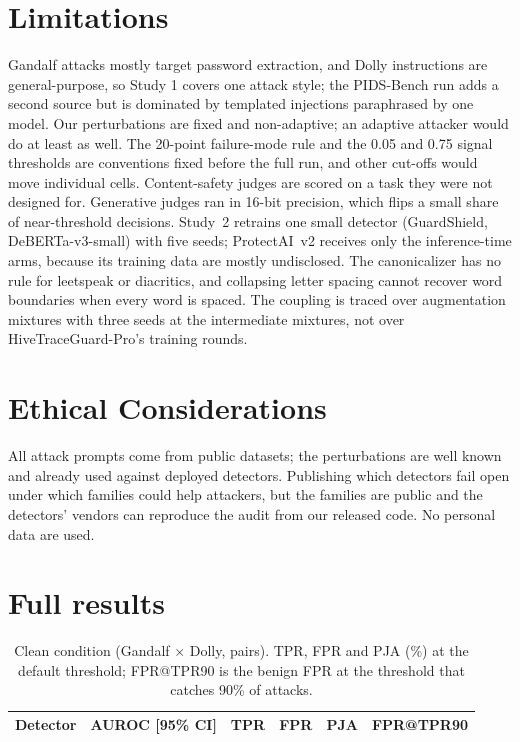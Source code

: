 \documentclass[conference]{IEEEtran}
\begin{document}
\section{Limitations}
Gandalf attacks mostly target password extraction, and Dolly instructions are general-purpose, so Study 1 covers one attack style; the PIDS-Bench run adds a second source but is dominated by templated injections paraphrased by one model. Our perturbations are fixed and non-adaptive; an adaptive attacker would do at least as well. The 20-point failure-mode rule and the 0.05 and 0.75 signal thresholds are conventions fixed before the full run, and other cut-offs would move individual cells. Content-safety judges are scored on a task they were not designed for. Generative judges ran in 16-bit precision, which flips a small share of near-threshold decisions. Study~2 retrains one small detector (GuardShield, DeBERTa-v3-small) with five seeds; ProtectAI~v2 receives only the inference-time arms, because its training data are mostly undisclosed. The canonicalizer has no rule for leetspeak or diacritics, and collapsing letter spacing cannot recover word boundaries when every word is spaced. The coupling is traced over augmentation mixtures with three seeds at the intermediate mixtures, not over HiveTraceGuard-Pro's training rounds.

\section{Ethical Considerations}
All attack prompts come from public datasets; the perturbations are well known and already used against deployed detectors. Publishing which detectors fail open under which families could help attackers, but the families are public and the detectors' vendors can reproduce the audit from our released code. No personal data are used.




\appendix
\section{Full results}

\begin{table}[t]
\centering\small
\caption{Clean condition (Gandalf $\times$ Dolly, \nPairs{} pairs). TPR, FPR and PJA (\%) at the default threshold; FPR@TPR90 is the benign FPR at the threshold that catches 90\% of attacks.}
\label{tab:clean}
\begin{tabular}{@{}lccccc@{}}
\toprule
Detector & AUROC [95\% CI] & TPR & FPR & PJA & FPR@TPR90 \\
\midrule

\bottomrule
\end{tabular}
\end{table}
\end{document}
